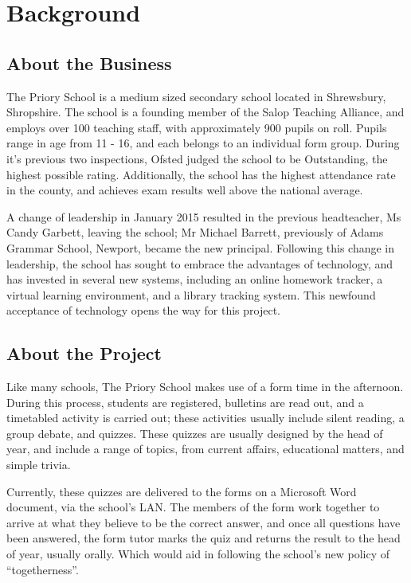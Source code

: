 \section{Background}

\subsection{About the Business}
The Priory School is a medium sized secondary school located in Shrewsbury, Shropshire. The school is a founding member of the Salop Teaching Alliance, and employs over 100 teaching staff, with approximately 900 pupils on roll. Pupils range in age from 11 - 16, and each belongs to an individual form group. During it's previous two inspections, Ofsted judged the school to be Outstanding, the highest possible rating. Additionally, the school has the highest attendance rate in the county, and achieves exam results well above the national average. 

A change of leadership in January 2015 resulted in the previous headteacher, Ms Candy Garbett, leaving the school; Mr Michael Barrett, previously of Adams Grammar School, Newport, became the new principal. Following this change in leadership, the school has sought to embrace the advantages of technology, and has invested in several new systems, including an online homework tracker, a virtual learning environment, and a library tracking system. This newfound acceptance of technology opens the way for this project.

\subsection{About the Project}
Like many schools, The Priory School makes use of a form time in the afternoon. During this process, students are registered, bulletins are read out, and a timetabled activity is carried out; these activities usually include silent reading, a group debate, and quizzes. These quizzes are usually designed by the head of year, and include a range of topics, from current affairs, educational matters, and simple trivia.

Currently, these quizzes are delivered to the forms on a Microsoft Word document, via the school's LAN. The members of the form work together to arrive at what they believe to be the correct answer, and once all questions have been answered, the form tutor marks the quiz and returns the result to the head of year, usually orally. Which would aid in following the school's new policy of ``togetherness''.